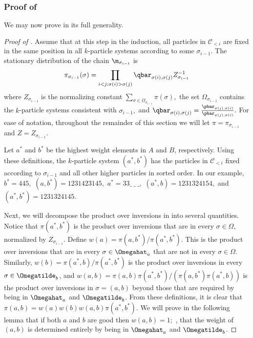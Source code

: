 \subsubsection{Proof of }
We may now prove  in its full generality.\\

%
\begin{proof}[Proof of ]   %
Assume that at this step in the induction, all particles in 
$\mathcal{C}_{< i}$ are fixed in the same position in all $k$-particle 
systems according to some $\sigma_{i-1}.$  The stationary distribution 
of the chain $\m_{\sigma_{i-1}}$ is $$\pi_{\sigma_{i-1}}(\sigma) =  
\prod_{i < j: \sigma(i) > \sigma(j)}\qbar_{\sigma(i), 
\sigma(j)}Z_{\sigma_{i-1}}^{-1}$$  
where $Z_{\sigma_{i-1}}$ is the normalizing constant $\sum_{\sigma \in 
\Omega_{\sigma_{i-1}}} \pi(\sigma),$ the set $\Omega_{\sigma_{i-1}}$ 
contains the $k$-particle systems consistent with $\sigma_{i-1},$ and 
$\qbar_{\sigma(i), 
\sigma(j)}=\frac{\pbar_{\sigma(j),\sigma(i)}}{\pbar_{\sigma(j),\sigma(i)}}.$  
For ease of notation, throughout the remainder of this section we will 
let $\pi = \pi_{\sigma_{i-1}}$ and $Z =Z_{\sigma_{i-1}}$.

Let $a^*$ and $b^*$ be the highest weight elements in $A$ and $B$, 
respectively.  Using these definitions, the $k$-particle system 
$(a^*,b^*)$ has the particles in $\mathcal{C}_{< i}$ fixed according to 
$\sigma_{i-1}$ and all other higher particles in sorted order.   In our 
example, $b^* = 445,$ $(a,b^*) = 1231423145,$ $a^* = 33\_\ \_\ \_,$ 
$(a^*,b) = 1231324154,$ and $(a^*,b^*) = 1231324145.$ 

Next, we will decompose the product over inversions in 
 into several quantities. Notice that 
$\pi(a^*,b^*)$ is the product over inversions that are in every 
$\sigma\in\Omega$, normalized by $Z_{\sigma_{i-1}}$.  Define $w(a) = 
\pi(a,b^*)/\pi(a^*,b^*).$  This is the product over inversions that are 
in every $\sigma\in\Omegahat_a$ that are not in every 
$\sigma\in\Omega$. Similarly, $w(b) = \pi(a^*,b)/\pi(a^*,b^*)$ is the 
product over inversions in every $\sigma\in\Omegatilde_b$, and $w(a,b) 
= \pi(a,b) \pi(a^*,b^*)/ (\pi(a,b^*)\pi(a^*,b))$ is the product over 
inversions in $\sigma=(a,b)$ beyond those that are required by being in 
$\Omegahat_a$ and $\Omegatilde_b$.  From these definitions, it is clear 
that $\pi(a,b) = w(a)w(b) w(a,b)\pi(a^*,b^*).$  We will prove in the 
following lemma that if both $a$ and $b$ are good then $w(a,b) = 1;$ 
\ie,  that the weight of $(a,b)$ is determined entirely by being in 
$\Omegahat_a$ and $\Omegatilde_b$.


\end{proof}
